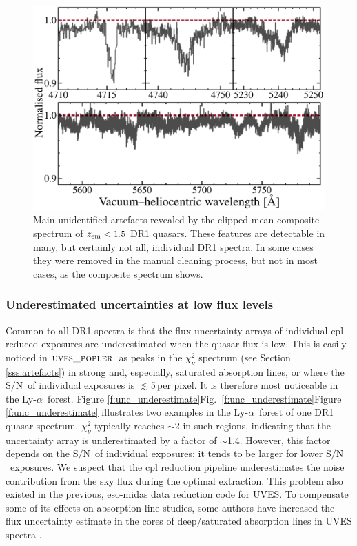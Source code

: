 \documentclass[fleqn,usenatbib,usedcolumn]{mnras}
\renewcommand{\la}{\lesssim} %
\newcommand{\Sref}[1]{Section \ref{#1}}
\newcommand{\Fref}[1]{\ifhmode \ifnum\spacefactor=1001 Figure \ref{#1}\else Fig.\ \ref{#1}\fi \else Figure \ref{#1}\fi}
\newcommand{\SN}{\ensuremath{\textrm{S/N}}}
\newcommand{\lya}{\ensuremath{\textrm{Ly-}\alpha}}
\newcommand{\zem}{\ensuremath{z_\textrm{\scriptsize em}}}
\newcommand{\popler}{\ensuremath{\textsc{uves\_popler}}}
\begin{document}
\begin{figure}
\begin{center}
\includegraphics[width=0.90\columnwidth]{DR1_unidentified.pdf}
\vspace{-1em}
\caption{Main unidentified artefacts revealed by the clipped mean composite spectrum of $\zem<1.5$ DR1 quasars. These features are detectable in many, but certainly not all, individual DR1 spectra. In some cases they were removed in the manual cleaning process, but not in most cases, as the composite spectrum shows.}
\label{f:unidentified}
\end{center}
\end{figure}

\subsubsection{Underestimated uncertainties at low flux levels}\label{sss:low_flux}

Common to all DR1 spectra is that the flux uncertainty arrays of individual {\sc cpl}-reduced exposures are underestimated when the quasar flux is low. This is easily noticed in \popler\ as peaks in the $\chi^2_\nu$ spectrum (see \Sref{sss:artefacts}) in strong and, especially, saturated absorption lines, or where the \SN\ of individual exposures is $\la$5\,per pixel. It is therefore most noticeable in the \lya\ forest. \Fref{f:unc_underestimate} illustrates two examples in the \lya\ forest of one DR1 quasar spectrum. $\chi^2_\nu$ typically reaches $\sim$2 in such regions, indicating that the uncertainty array is underestimated by a factor of $\sim$1.4. However, this factor depends on the \SN\ of individual exposures: it tends to be larger for lower \SN\ exposures. We suspect that the {\sc cpl} reduction pipeline underestimates the noise contribution from the sky flux during the optimal extraction. This problem also existed in the previous, {\sc eso-midas} data reduction code for UVES. To compensate some of its effects on absorption line studies, some authors have increased the flux uncertainty estimate in the cores of deep/saturated absorption lines in UVES spectra \citep[e.g.][]{King:2012:3370}.
\end{document}

